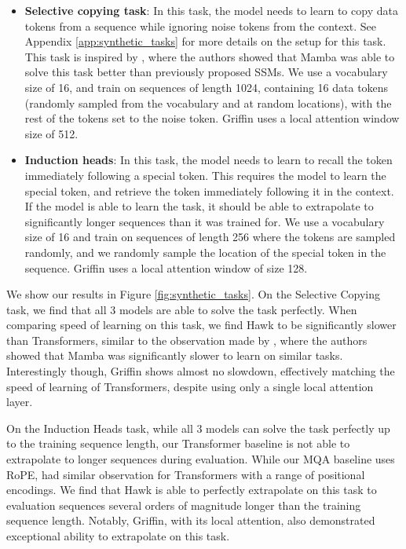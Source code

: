 \begin{itemize}
    \item \textbf{Selective copying task}: In this task, the model needs to learn to copy data tokens from a sequence while ignoring noise tokens from the context. See Appendix \ref{app:synthetic_tasks} for more details on the setup for this task. This task is inspired by \citet{gu2023mamba}, where the authors showed that Mamba was able to solve this task better than previously proposed SSMs. We use a vocabulary size of 16, and train on sequences of length 1024, containing 16 data tokens (randomly sampled from the vocabulary and at random locations), with the rest of the tokens set to the noise token. Griffin uses a local attention window size of 512. \\
    \item \textbf{Induction heads}: In this task, the model needs to learn to recall the token immediately following a special token. This requires the model to learn the special token, and retrieve the token immediately following it in the context. If the model is able to learn the task, it should be able to extrapolate to significantly longer sequences than it was trained for. We use a vocabulary size of 16 and train on sequences of length 256 where the tokens are sampled randomly, and we randomly sample the location of the special token in the sequence. Griffin uses a local attention window of size 128.
\end{itemize}

We show our results in Figure \ref{fig:synthetic_tasks}. 
On the Selective Copying task, we find that all 3 models are able to solve the task perfectly. When comparing speed of learning on this task, we find Hawk to be significantly slower than Transformers, similar to the observation made by \citet{jelassi2024repeat}, where the authors showed that Mamba was significantly slower to learn on similar tasks. Interestingly though, Griffin shows almost no slowdown, effectively matching the speed of learning of Transformers, despite using only a single local attention layer.

On the Induction Heads task, while all 3 models can solve the task perfectly up to the training sequence length, our Transformer baseline is not able to extrapolate to longer sequences during evaluation. While our MQA baseline uses RoPE, \citet{gu2023mamba} had similar observation for Transformers with a range of positional encodings. We find that Hawk is able to perfectly extrapolate on this task to evaluation sequences several orders of magnitude longer than the training sequence length. Notably, Griffin, with its local attention, also demonstrated exceptional ability to extrapolate on this task.

